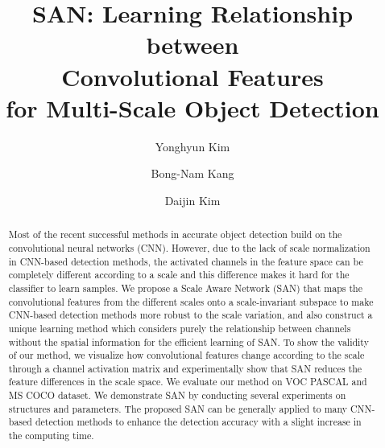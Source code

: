\documentclass[runningheads]{llncs}
\newcommand{\etal}{\textit{et al.}}
\begin{document}
%
\title{SAN: Learning Relationship between \\ Convolutional Features \\for Multi-Scale Object Detection} 

%
\author{Yonghyun Kim \and
	Bong-Nam Kang \and
	Daijin Kim}
%
\authorrunning{Y. Kim~\etal}
%

%
\maketitle              %
%
\begin{abstract}
	Most of the recent successful methods in accurate object detection build on the convolutional neural networks (CNN).
	However, due to the lack of scale normalization in CNN-based detection methods, the activated channels in the feature space can be completely different according to a scale and this difference makes it hard for the classifier to learn samples. 
	We propose a Scale Aware Network (SAN) that maps the convolutional features from the different scales onto a scale-invariant subspace to make CNN-based detection methods more robust to the scale variation, and also construct a unique learning method which considers purely the relationship between channels without the spatial information for the efficient learning of SAN.
	To show the validity of our method, we visualize how convolutional features change according to the scale through a channel activation matrix and experimentally show that SAN reduces the feature differences in the scale space.
	We evaluate our method on VOC PASCAL and MS COCO dataset.
	We demonstrate SAN by conducting several experiments on structures and parameters.	
	The proposed SAN can be generally applied to many CNN-based detection methods to enhance the detection accuracy with a slight increase in the computing time. 
\end{abstract}
%
%
%
\end{document}
